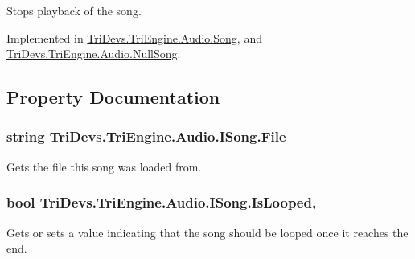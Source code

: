 Stops playback of the song. 



Implemented in \hyperlink{class_tri_devs_1_1_tri_engine_1_1_audio_1_1_song_adca6c6a618ca8456e29802036d64fd59}{Tri\-Devs.\-Tri\-Engine.\-Audio.\-Song}, and \hyperlink{class_tri_devs_1_1_tri_engine_1_1_audio_1_1_null_song_af8bc76d16811d59296f0979810c792e4}{Tri\-Devs.\-Tri\-Engine.\-Audio.\-Null\-Song}.



\subsection{Property Documentation}
\hypertarget{interface_tri_devs_1_1_tri_engine_1_1_audio_1_1_i_song_a205590d12f0472f544e82405d6594f38}{
\subsubsection[{File}]{\setlength{\rightskip}{0pt plus 5cm}string Tri\-Devs.\-Tri\-Engine.\-Audio.\-I\-Song.\-File\hspace{0.3cm}{\ttfamily [get]}}}\label{interface_tri_devs_1_1_tri_engine_1_1_audio_1_1_i_song_a205590d12f0472f544e82405d6594f38}


Gets the file this song was loaded from. 

\hypertarget{interface_tri_devs_1_1_tri_engine_1_1_audio_1_1_i_song_a4d3e7c993097fd4ee1397997395cf71d}{
\subsubsection[{Is\-Looped}]{\setlength{\rightskip}{0pt plus 5cm}bool Tri\-Devs.\-Tri\-Engine.\-Audio.\-I\-Song.\-Is\-Looped\hspace{0.3cm}{\ttfamily [get]}, {\ttfamily [set]}}}\label{interface_tri_devs_1_1_tri_engine_1_1_audio_1_1_i_song_a4d3e7c993097fd4ee1397997395cf71d}


Gets or sets a value indicating that the song should be looped once it reaches the end. 

